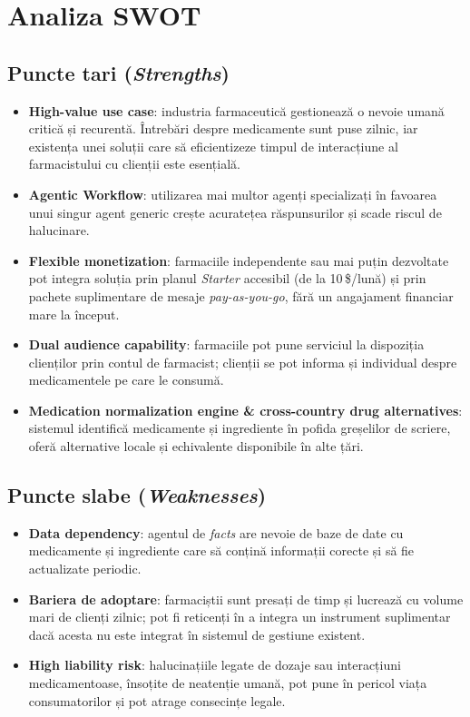 \section{Analiza SWOT}

\subsection{Puncte tari (\textit{Strengths})}
\begin{itemize}
    \item \textbf{High-value use case}: industria farmaceutică gestionează o nevoie umană critică și recurentă. Întrebări despre medicamente sunt puse zilnic, iar existența unei soluții care să eficientizeze timpul de interacțiune al farmacistului cu clienții este esențială.
    \item \textbf{Agentic Workflow}: utilizarea mai multor agenți specializați în favoarea unui singur agent generic crește acuratețea răspunsurilor și scade riscul de halucinare.
    \item \textbf{Flexible monetization}: farmaciile independente sau mai puțin dezvoltate pot integra soluția prin planul \textit{Starter} accesibil (de la 10\,\$/lună) și prin pachete suplimentare de mesaje \textit{pay-as-you-go}, fără un angajament financiar mare la început.
    \item \textbf{Dual audience capability}: farmaciile pot pune serviciul la dispoziția clienților prin contul de farmacist; clienții se pot informa și individual despre medicamentele pe care le consumă.
    \item \textbf{Medication normalization engine \& cross-country drug alternatives}: sistemul identifică medicamente și ingrediente în pofida greșelilor de scriere, oferă alternative locale și echivalente disponibile în alte țări.
\end{itemize}

\subsection{Puncte slabe (\textit{Weaknesses})}
\begin{itemize}
    \item \textbf{Data dependency}: agentul de \textit{facts} are nevoie de baze de date cu medicamente și ingrediente care să conțină informații corecte și să fie actualizate periodic.
    \item \textbf{Bariera de adoptare}: farmaciștii sunt presați de timp și lucrează cu volume mari de clienți zilnic; pot fi reticenți în a integra un instrument suplimentar dacă acesta nu este integrat în sistemul de gestiune existent.
    \item \textbf{High liability risk}: halucinațiile legate de dozaje sau interacțiuni medicamentoase, însoțite de neatenție umană, pot pune în pericol viața consumatorilor și pot atrage consecințe legale.
\end{itemize}

